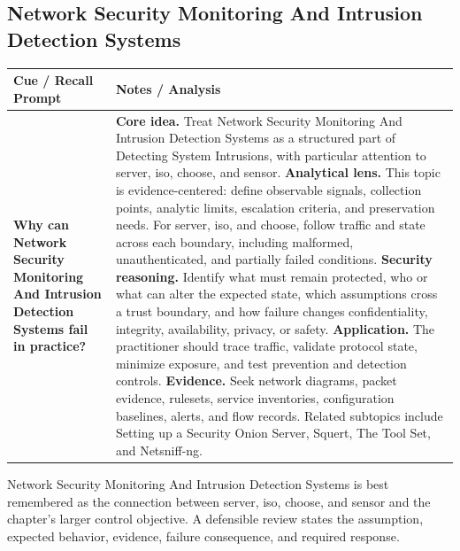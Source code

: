 \documentclass[11pt]{article}
\newcommand{\CornellHeader}{%
\rowcolor{Navy}\color{white}\bfseries Cue / Recall Prompt & \color{white}\bfseries Notes / Analysis\\\hline}
\newcommand{\CornellRow}[2]{%
\cellcolor{CueGray}\RaggedRight\textbf{#1} & \RaggedRight #2\\\hline}
\begin{document}
\subsection*{Network Security Monitoring And Intrusion Detection Systems}
\begin{longtable}{>{\RaggedRight\arraybackslash}p{}|>{\RaggedRight\arraybackslash}p{}}
\CornellHeader
\CornellRow{Why can Network Security Monitoring And Intrusion Detection Systems fail in practice?}{\textbf{Core idea.} Treat Network Security Monitoring And Intrusion Detection Systems as a structured part of Detecting System Intrusions, with particular attention to server, iso, choose, and sensor. \textbf{Analytical lens.} This topic is evidence-centered: define observable signals, collection points, analytic limits, escalation criteria, and preservation needs. For server, iso, and choose, follow traffic and state across each boundary, including malformed, unauthenticated, and partially failed conditions. \textbf{Security reasoning.} Identify what must remain protected, who or what can alter the expected state, which assumptions cross a trust boundary, and how failure changes confidentiality, integrity, availability, privacy, or safety. \textbf{Application.} The practitioner should trace traffic, validate protocol state, minimize exposure, and test prevention and detection controls. \textbf{Evidence.} Seek network diagrams, packet evidence, rulesets, service inventories, configuration baselines, alerts, and flow records. Related subtopics include Setting up a Security Onion Server, Squert, The Tool Set, and Netsniff-ng.}
\end{longtable}
\begin{topicsummary}
Network Security Monitoring And Intrusion Detection Systems is best remembered as the connection between server, iso, choose, and sensor and the chapter's larger control objective. A defensible review states the assumption, expected behavior, evidence, failure consequence, and required response.
\end{topicsummary}
\end{document}
